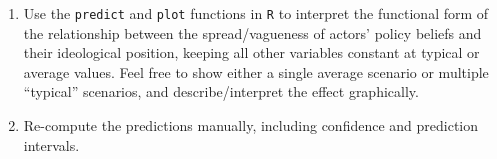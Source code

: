 \documentclass[a4paper,11pt]{article}
\begin{document}
\begin{enumerate}
 \item Use the \texttt{predict} and \texttt{plot} functions in \texttt{R} to interpret the functional form of the relationship between the spread/vagueness of actors' policy beliefs and their ideological position, keeping all other variables constant at typical or average values. Feel free to show either a single average scenario or multiple ``typical'' scenarios, and describe/interpret the effect graphically.
 \item Re-compute the predictions manually, including confidence and prediction intervals.
\end{enumerate}



\end{document}

